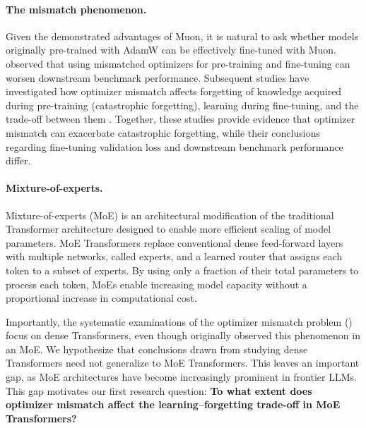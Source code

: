 \documentclass[11pt,a4paper]{article}
\begin{document}
\paragraph{The mismatch phenomenon.}
Given the demonstrated advantages of Muon, it is natural to ask whether models originally pre-trained with AdamW  can be effectively fine-tuned with Muon.   \cite{liu2025muon} observed that using mismatched optimizers for pre-training and fine-tuning can worsen downstream benchmark performance. Subsequent studies have investigated how optimizer mismatch affects forgetting of knowledge acquired during pre-training (catastrophic forgetting), learning during fine-tuning, and the trade-off between them \cite{zhao2026ephemeral, qu2026canmuon, liu2026consistency}. Together, these studies provide evidence that optimizer mismatch can exacerbate catastrophic forgetting, while their conclusions regarding fine-tuning validation loss and downstream benchmark performance differ. 

\paragraph{Mixture-of-experts.}
Mixture-of-experts (MoE) is an architectural modification of the traditional Transformer architecture designed to enable more efficient scaling of model parameters. MoE Transformers replace conventional dense feed-forward layers with multiple networks, called experts, and a learned router that assigns each token to a subset of experts. By using only a fraction of their total parameters to process each token, MoEs enable increasing model capacity without a proportional increase in computational cost. 

Importantly, the systematic examinations of the optimizer mismatch problem (\cite{zhao2026ephemeral, liu2026consistency,qu2026canmuon}) focus on dense Transformers, even though \cite{liu2025muon} originally observed this phenomenon in an MoE. We hypothesize that conclusions drawn from studying dense Transformers need not generalize to MoE Transformers. This leaves an important gap, as MoE architectures have become increasingly prominent in frontier LLMs. This gap motivates our first research question: \textbf{To what extent does optimizer mismatch affect the learning--forgetting trade-off in MoE Transformers?} 
\end{document}
